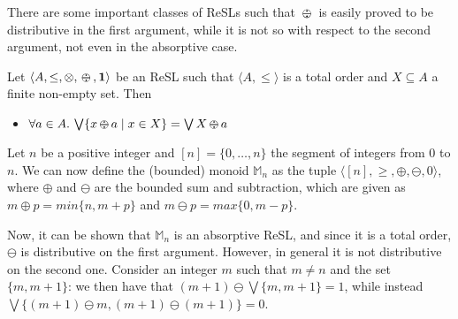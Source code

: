 \documentclass{llncs}
\newcommand{\shortNoProof}[1]{ }
\def\monid{{\mathbf 0}}
\def\monop{\otimes}
\def\odiv{\, {\ominus\hspace{-7.7pt} \div} \,}
\def\monid{\mathbf{1}}
\begin{document}

There are some important classes of ReSLs  such that $\odiv$ is easily proved to be distributive in the first argument,
while it is not so with respect to the second argument, not even in the absorptive case.

\begin{lemma}
	\label{distodiv2}
	Let $\langle A, \leq, \monop, \odiv, \monid \rangle$ be an ReSL such that $\langle A, \leq \rangle$ is a total order and $X \subseteq A$ a finite non-empty set. Then 
	\begin{itemize}
		\item $\forall a \in A.\, \bigvee \{ x \odiv a \mid x \in X \} = \bigvee X \odiv a$
	\end{itemize}	
\end{lemma}

\shortNoProof{
\begin{proof}
If $\langle A, \leq \rangle$ is a total order and $X$ is finite and non-empty we have that $\bigvee X \in X$, and since $\odiv$ 
is monotone on the first argument (see Lemma~\ref{mono}) the result follows.
\qed
\end{proof}
}

\begin{example}
\label{nodist2}
%
Let $n$ be a positive integer and $[n] = \{0, \ldots, n\}$ the segment of integers from $0$ to $n$. We can now define the (bounded) monoid $\mathbb{M}_n$ 
as the tuple $\langle [n], \geq, \oplus, \ominus, 0 \rangle$, where $\oplus$ and $\ominus$ are the bounded sum and subtraction, 
which are given as $m\oplus p = min\{n, m+p\}$ and $m\ominus p = max\{0,m-p\}$.

Now, it can be shown that $\mathbb{M}_n$ is an absorptive ReSL, and since it is a total order,
$\ominus$ is  distributive on the first argument.
%
However, in general it is not distributive on the second one. Consider an integer $m$ such that 
$m \neq n$ and the set $\{m, m+1\}$:
we then have that $(m+1) \ominus \bigvee\{m, m+1\} = 1$,
while instead $\bigvee\{(m+1) \ominus m, (m+1) \ominus (m+1)\} = 0$.
\end{example}
\end{document}
